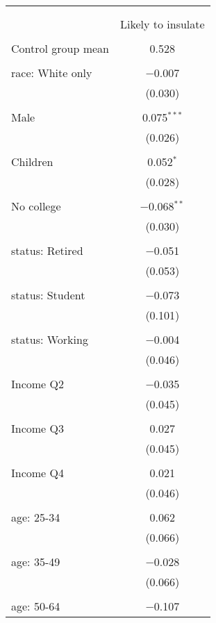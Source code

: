 
\begin{tabular}{@{\extracolsep{5pt}}lc} 
\\[-1.8ex]\hline 
\hline \\[-1.8ex] 
\\[-1.8ex] & Likely to insulate \\ 
\hline \\[-1.8ex] 
 Control group mean & 0.528  \\ \hline \\[-1.8ex] race: White only & $-$0.007 \\ 
  & (0.030) \\ 
  & \\ 
 Male & 0.075$^{***}$ \\ 
  & (0.026) \\ 
  & \\ 
 Children & 0.052$^{*}$ \\ 
  & (0.028) \\ 
  & \\ 
 No college & $-$0.068$^{**}$ \\ 
  & (0.030) \\ 
  & \\ 
 status: Retired & $-$0.051 \\ 
  & (0.053) \\ 
  & \\ 
 status: Student & $-$0.073 \\ 
  & (0.101) \\ 
  & \\ 
 status: Working & $-$0.004 \\ 
  & (0.046) \\ 
  & \\ 
 Income Q2 & $-$0.035 \\ 
  & (0.045) \\ 
  & \\ 
 Income Q3 & 0.027 \\ 
  & (0.045) \\ 
  & \\ 
 Income Q4 & 0.021 \\ 
  & (0.046) \\ 
  & \\ 
 age: 25-34 & 0.062 \\ 
  & (0.066) \\ 
  & \\ 
 age: 35-49 & $-$0.028 \\ 
  & (0.066) \\ 
  & \\ 
 age: 50-64 & $-$0.107 \\ 

\end{tabular}
